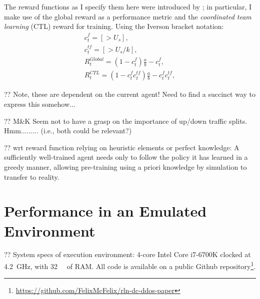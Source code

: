 \documentclass[conference, letterpaper, 10pt, times]{IEEEtran}
\begin{document}
The reward functions as I specify them here were introduced by \textcite{DBLP:journals/eaai/MalialisK15}; in particular, I make use of the global reward as a performance metric and the \emph{coordinated team learning} (CTL) reward for training.
Using the Iverson bracket notation:
\begin{subequations}
\begin{align}
c_t^{\mathit{f}} = [ > U_s],\\
c_t^{\mathit{tf}} = [ > U_s/k],\\
R_{t}^{\mathit{Global}} = (1 - c_t^{\mathit{f}})\frac{a}{b} - c_t^{\mathit{f}},\\
R_{t}^{\mathit{CTL}} = (1 - c_t^{\mathit{f}}c_t^{\mathit{tf}})\frac{a}{b} - c_t^{\mathit{f}}c_t^{\mathit{tf}},
\end{align}
\end{subequations}

?? Note, these are dependent on the current agent! Need to find a succinct way to express this somehow...

?? M\&K Seem not to have a grasp on the importance of up/down traffic splits. Hmm......... (i.e., both could be relevant?)

?? wrt reward function relying on heuristic elements or perfect knowledge:
A sufficiently well-trained agent needs only to follow the policy it has learned in a greedy manner, allowing pre-training using a priori knowledge by simulation to transfer to reality.

\section{Performance in an Emulated Environment}

?? System specs of execution environment: 4-core Intel Core i7-6700K clocked at \SI{4.2}{\giga\hertz}, with \SI{32}{\gibi\byte} of RAM. All code is available on a public Github repository\footnote{\url{https://github.com/FelixMcFelix/rln-dc-ddos-paper}}.
\end{document}
